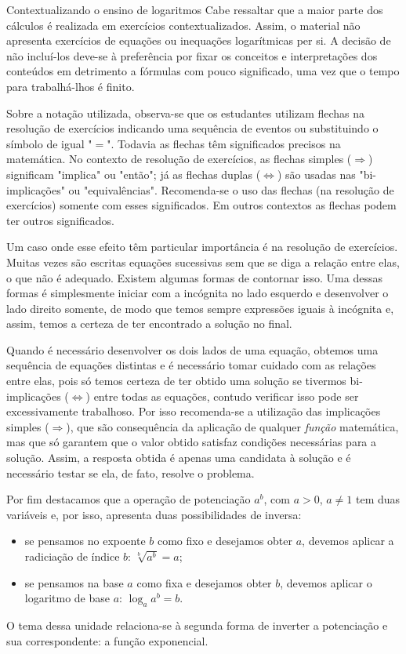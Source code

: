 \begin{apresentacao}{Contextualizando o ensino de logaritmos}
Cabe ressaltar que a maior parte dos cálculos é realizada em exercícios contextualizados. Assim, o material não apresenta exercícios de equações ou inequações logarítmicas per si. A decisão de não incluí-los deve-se à preferência por fixar os conceitos e interpretações dos conteúdos em detrimento a fórmulas com pouco significado, uma vez que o tempo para trabalhá-lhos é finito.

Sobre a notação utilizada, observa-se que os estudantes utilizam flechas na resolução de exercícios indicando uma sequência de eventos ou substituindo o símbolo de igual "$=$". Todavia as flechas têm significados precisos na matemática. No contexto de resolução de exercícios, as flechas simples ($\Longrightarrow$) significam "implica" ou "então"; já as flechas duplas ($\Longleftrightarrow$) são usadas nas "bi-implicações" ou "equivalências". Recomenda-se o uso das flechas (na resolução de exercícios) somente com esses significados. Em outros contextos as flechas podem ter outros significados.

Um caso onde esse efeito têm particular importância é na resolução de exercícios. Muitas vezes são escritas equações sucessivas sem que se diga a relação entre elas, o que não é adequado. Existem algumas formas de contornar isso. Uma dessas formas é simplesmente iniciar com a incógnita no lado esquerdo e desenvolver o lado direito somente, de modo que temos sempre expressões iguais à incógnita e, assim, temos a certeza de ter encontrado a solução no final.

Quando é necessário desenvolver os dois lados de uma equação, obtemos uma sequência de equações distintas e é necessário tomar cuidado com as relações entre elas, pois só temos certeza de ter obtido uma solução se tivermos bi-implicações ($\Longleftrightarrow$) entre todas as equações, contudo verificar isso pode ser excessivamente trabalhoso. Por isso recomenda-se a utilização das implicações simples ($\Rightarrow$), que são consequência da aplicação de qualquer \textit{função} matemática, mas que só garantem que o valor obtido satisfaz condições necessárias para a solução. Assim, a resposta obtida é apenas uma candidata à solução e é necessário testar se ela, de fato, resolve o problema.

Por fim destacamos que a operação de potenciação $a^b$, com $a>0$, $a\neq 1$ tem duas variáveis e, por isso, apresenta duas possibilidades de inversa:
\begin{itemize}
\item se pensamos no expoente $b$ como fixo e desejamos obter $a$, devemos aplicar a radiciação de índice $b$: $\sqrt[b]{a^b}=a$;
\item se pensamos na base $a$ como fixa e desejamos obter $b$, devemos aplicar o logaritmo de base $a$: $\log_a a^b =b$.
\end{itemize}
O tema dessa unidade relaciona-se à segunda forma de inverter a potenciação e sua correspondente: a função exponencial.
\end{apresentacao}

